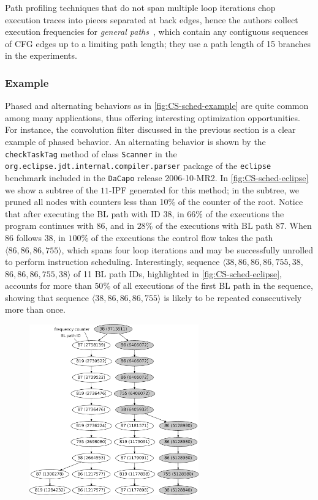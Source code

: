 \noindent Path profiling techniques that do not span multiple loop iterations chop execution traces into pieces separated at back edges, hence the authors collect execution frequencies for {\em general paths}~\cite{Young98thesis}, which contain any contiguous sequences of CFG edges up to a limiting path length; they use a path length of 15 branches in the experiments.

\subsubsection*{Example}
Phased and alternating behaviors as in \myfigure\ref{fig:CS-sched-example} are quite common among many applications, thus offering interesting optimization opportunities. For instance, the convolution filter discussed in the previous section is a clear example of phased behavior. An alternating behavior is shown by the {\tt checkTaskTag} method of class {\tt Scanner} in the {\tt org.eclipse.jdt.internal.compiler.parser} package of the {\tt eclipse} benchmark included in the {\tt DaCapo} release 2006-10-MR2. In \myfigure\ref{fig:CS-sched-eclipse} we show a subtree of the $11$-IPF generated for this method; in the subtree, we pruned all nodes with counters less than 10\% of the counter of the root. Notice that after executing the BL path with ID $38$, in $66\%$ of the executions the program continues with $86$, and in $28\%$ of the executions with BL path $87$. When $86$ follows $38$, in $100\%$ of the executions the control flow takes the path $\langle 86, 86, 86, 755\rangle$, which spans four loop iterations and may be successfully unrolled to perform instruction scheduling. Interestingly, sequence $\langle 38, 86, 86, 86, 755, 38,$ $86, 86, 86, 755, 38\rangle$ of 11 BL path IDs, highlighted in \myfigure\ref{fig:CS-sched-eclipse}, accounts for more than $50\%$ of all executions of the first BL path in the sequence, showing that sequence $\langle 38, 86, 86, 86, 755\rangle$ is likely to be repeated consecutively more than once.

\ifdefined\noauthorea
\begin{figure}[!ht]
\begin{center}
\includegraphics[width=0.65\textwidth]{figures/CS-sched-eclipse/CS-sched-eclipse.eps}
\caption{\protect}
\end{center}
\end{figure}
\fi

